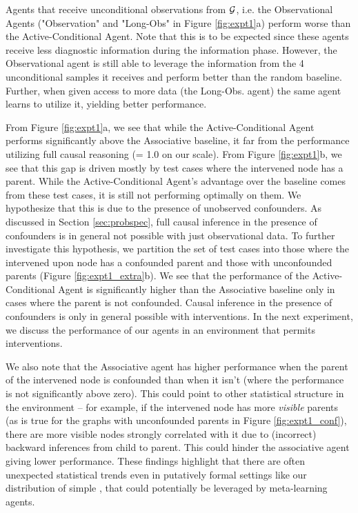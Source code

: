 Agents that receive unconditional observations from $\cal G$, i.e. the Observational Agents ("Observation" and "Long-Obs" in Figure \ref{fig:expt1}a) perform worse than the Active-Conditional Agent. Note that this is to be expected since these agents receive less diagnostic information during the information phase. However, the Observational agent is still able to leverage the information from the 4 unconditional samples it receives and perform better than the random baseline. Further, when given access to more data (the Long-Obs. agent) the same agent learns to utilize it, yielding better performance.

From Figure \ref{fig:expt1}a, we see that while the Active-Conditional Agent performs significantly above the Associative baseline, it far from the performance utilizing full causal reasoning (= 1.0 on our scale). From Figure \ref{fig:expt1}b, we see that this gap is driven mostly by test cases where the intervened node has a parent. While the Active-Conditional Agent's advantage over the baseline comes from these test cases, it is still not performing optimally on them. We hypothesize that this is due to the presence of unobserved confounders. As discussed in Section \ref{sec:probspec}, full causal inference in the presence of confounders is in general not possible with just observational data. 
To further investigate this hypothesis, we partition the set of test cases into those where the intervened upon node has a confounded parent and those with unconfounded parents (Figure \ref{fig:expt1_extra}b). We see that the performance of the Active-Conditional Agent is significantly higher than the Associative baseline only in cases where the parent is not confounded. Causal inference in the presence of confounders is only in general possible with interventions. In the next experiment, we discuss the performance of our agents in an environment that permits interventions.

 
We also note that the Associative agent has higher performance when the parent of the intervened node is confounded than when it isn't (where the performance is not significantly above zero). This could point to other statistical structure in the environment -- for example, if the intervened node has more \textit{visible} parents (as is true for the graphs with unconfounded parents in Figure \ref{fig:expt1_conf}), there are more visible nodes strongly correlated with it due to (incorrect) backward inferences from child to parent. This could hinder the associative agent giving lower performance. These findings highlight that there are often unexpected statistical trends even in putatively formal settings like our distribution of simple \CBNs, that could potentially be leveraged \citep{janzing2009telling, hoyer2009nonlinear} by meta-learning agents.

